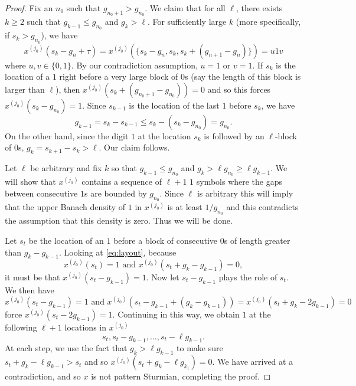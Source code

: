 \documentclass[10pt,a4paper]{amsart}
\begin{document}
\begin{proof}
Fix an $n_0$ such that $g_{n_0+1} > g_{n_0}$. We claim that for all $\ell$, there exists $k \geq 2$ such that $g_{k-1} \leq g_{n_0}$ and $g_{k} > \ell$. For sufficiently large $k$ (more specifically, if $s_k > g_{n_0}$), we have
\begin{equation}\label{eq:layout}
    x^{(j_0)}(s_k - g_n + \tau) = x^{(j_0)}(\{s_k - g_n, s_k, s_k + (g_{n+1} - g_{n})\}) = u1v
\end{equation}
where $u, v \in \{0, 1\}$. By our contradiction assumption, $u = 1$ or $v = 1$. If $s_k$ is the location of a $1$ right before a very large block of $0$s (say the length of this block is larger than $\ell$), then $x^{(j_0)}(s_k + (g_{n_0+1} - g_{n_0})) = 0$ and so this forces $x^{(j_0)}(s_k - g_{n_0}) = 1$. Since $s_{k-1}$ is the location of the last $1$ before $s_k$, we have 
\[
    g_{k-1} = s_k - s_{k-1} \leq s_k - (s_k - g_{n_0}) = g_{n_0}.
\]
On the other hand, since the digit $1$ at the location $s_k$ is followed by an $\ell$-block of $0$s, $g_k = s_{k+1} - s_k > \ell$. Our claim follows.


Let $\ell$ be arbitrary and fix $k$ so that $g_{k-1} \leq g_{n_0}$ and $g_k > \ell g_{n_0} \geq \ell g_{k-1}$.
We will show that $x^{(j_0)}$ contains a sequence of $\ell + 1$ $1$ symbols where the gaps between consecutive $1$s are bounded by $g_{n_0}$. Since $\ell$ is arbitrary this will imply that the upper Banach density of $1$ in $x^{(j_0)}$ is at least $1/g_{n_0}$ and this contradicts the assumption that this density is zero. Thus we will be done. 


Let $s_t$ be the location of an $1$ before a block of consecutive $0$s of length greater than $g_k - g_{k-1}$.
Looking at \eqref{eq:layout}, because 
\[
    x^{(j_0)}(s_t) = 1 \text{ and } x^{(j_0)}(s_t + g_{k} - g_{k-1}) = 0,
\]
it must be that $x^{(j_0)}(s_t - g_{k-1}) = 1$. Now let $s_t - g_{k-1}$ plays the role of $s_t$. We then have 
\[
    x^{(j_0)}(s_t - g_{k-1}) = 1 \text{ and } x^{(j_0)}(s_t - g_{k-1} + (g_k - g_{k-1}))= x^{(j_0)}(s_t + g_k - 2 g_{k-1}) = 0
\]
force $x^{(j_0)}(s_t - 2 g_{k-1}) = 1$. Continuing in this way, we obtain $1$ at the following $\ell + 1$ locations in $x^{(j_0)}$
\[
    s_t, s_t - g_{k-1}, \ldots, s_t - \ell g_{k-1}.
\]
At each step, we use the fact that $g_k > \ell g_{k-1}$ to make sure $s_t + g_k - \ell g_{k-1} > s_t$ and so $x^{(j_0)}(s_t + g_k - \ell g_{k_1}) = 0$. We have arrived at a contradiction, and so $x$ is not pattern Sturmian, completing the proof.
\end{proof}
\end{document}
